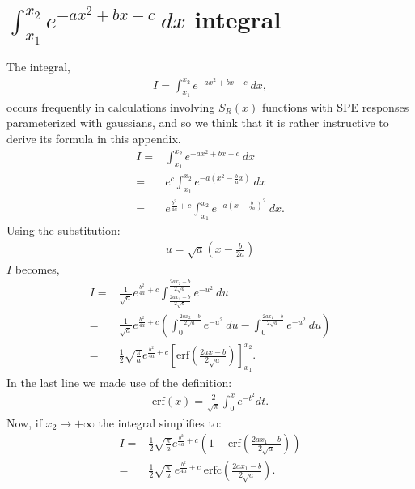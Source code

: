 \documentclass[preprint,12pt]{elsarticle}
\begin{document}

\appendix


\section{$\int_{ x_1 }^{x_2}  e^{-a x^2 +b x +c } \ dx$ integral}
\label{app:int}

The integral, 
\begin{align}
I = \int_{ x_1 }^{x_2}  e^{-a x^2 +b x +c } \ dx,
\end{align}
occurs frequently in calculations involving $S_R(x)$ functions with SPE responses parameterized with gaussians, and so we think that it is rather instructive to derive its formula in this appendix. 
\begin{align}
I = & \int_{ x_1 }^{x_2}  e^{-a x^2 +b x +c } \ dx \nonumber \\
  = & e^c \int_{ x_1 }^{x_2}  e^{-a ( x^2 - \frac{b}{a} x )} \ dx  \nonumber \\
  = & e^{\frac{b^2}{4a}+c} \int_{ x_1 }^{x_2}  e^{-a ( x - \frac{b}{2a} )^2} \ dx. 
\end{align}
Using the substitution: 
\begin{align}
u = \sqrt{a} ( x - \frac{b}{2a} )  
\end{align}
$I$ becomes,
\begin{align}
I = &  \frac{1}{\sqrt{a}} e^{\frac{b^2}{4a}+c} \int_{ \frac{2a x_1 -b }{2\sqrt{a}} }^{ \frac{2a x_2 -b }{2\sqrt{a}} }  e^{-u^2 } \ du \nonumber \\
  = & \frac{1}{\sqrt{a}} e^{\frac{b^2}{4a}+c} \left(   \int_{ 0 }^{ \frac{2a x_2 -b }{2\sqrt{a}} }  e^{-u^2 } \ du -  \int^{ \frac{2a x_1 -b }{2\sqrt{a}} }_{ 0 }  e^{-u^2 } \ du\right)  \nonumber \\
  = &  \frac{1}{2}  \sqrt{\frac{\pi}{a} } e^{\frac{b^2}{4a}+c} \left[ \text{erf}\left({ \frac{2a x -b }{2\sqrt{a}} }\right) \right]^{ x_2 }_{ x_1 }.
\end{align}
In the last line we made use of the definition:
\begin{align}
 \text{erf}(x) = \frac{2}{\sqrt{\pi}} \int_0^x e^{-t^2} dt. 
 \end{align}
 Now, if $x_2\rightarrow +\infty$ the integral simplifies to:
 \begin{align}
I = &  \frac{1}{2}  \sqrt{\frac{\pi}{a} } e^{\frac{b^2}{4a}+c} \left( 1 - \text{erf}\left({ \frac{2a x_1 -b }{2\sqrt{a}} }\right) \right) \nonumber \\
  = & \frac{1}{2}  \sqrt{\frac{\pi}{a} } \ e^{\frac{b^2}{4a}+c} \ \text{erfc}\left({ \frac{2a x_1 -b }{2\sqrt{a}} }\right). \label{eq:intg}
\end{align}
\end{document}
